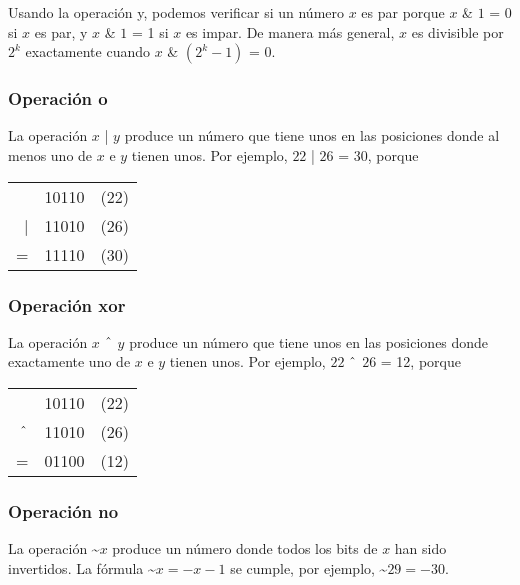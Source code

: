 Usando la operación y, podemos verificar si un número
$x$ es par porque
$x$ \& $1$ = 0 si $x$ es par, y
$x$ \& $1$ = 1 si $x$ es impar.
De manera más general, $x$ es divisible por $2^k$
exactamente cuando $x$ \& $(2^k-1)$ = 0.

\subsubsection{Operación o}


La operación  $x$ | $y$ produce un número
que tiene unos en las posiciones donde al menos uno
de $x$ e $y$ tienen unos.
Por ejemplo, $22$ | $26$ = 30, porque

\begin{center}
\begin{tabular}{rrr}
& 10110 & (22)\\
| & 11010 & (26) \\
\hline
 = & 11110 & (30) \\
\end{tabular}
\end{center}

\subsubsection{Operación xor}


La operación  $x$ $\XOR$ $y$ produce un número
que tiene unos en las posiciones donde exactamente uno
de $x$ e $y$ tienen unos.
Por ejemplo, $22$ $\XOR$ $26$ = 12, porque

\begin{center}
\begin{tabular}{rrr}
& 10110 & (22)\\
$\XOR$ & 11010 & (26) \\
\hline
 = & 01100 & (12) \\
\end{tabular}
\end{center}

\subsubsection{Operación no}


La operación  \textasciitilde$x$
produce un número donde todos los bits de $x$
han sido invertidos.
La fórmula \textasciitilde$x = -x-1$ se cumple,
por ejemplo, \textasciitilde$29 = -30$.

